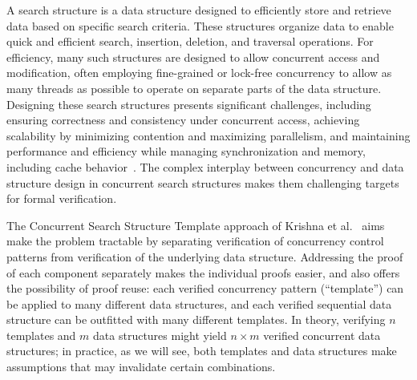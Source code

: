 \documentclass[a4paper,UKenglish,cleveref, autoref, thm-restate]{lipics-v2021}
\begin{document}
A search structure is a data structure designed to efficiently store and retrieve data based on specific search criteria. These structures organize data to enable quick and efficient search, insertion, deletion, and traversal operations. For efficiency, many such structures are designed to allow concurrent access and modification, often employing fine-grained or lock-free concurrency to allow as many threads as possible to operate on separate parts of the data structure. Designing these search structures presents significant challenges, including ensuring correctness and consistency under concurrent access, achieving scalability by minimizing contention and maximizing parallelism, and maintaining performance and efficiency while managing synchronization and memory, including cache behavior~\cite{masstree}. The complex interplay between concurrency and data structure design in concurrent search structures makes them challenging targets for formal verification.

The Concurrent Search Structure Template approach of Krishna et al.~\cite{templates} aims make the problem tractable by separating verification of concurrency control patterns from verification of the underlying data structure. Addressing the proof of each component separately makes the individual proofs easier, and also offers the possibility of proof reuse: each verified concurrency pattern (``template'') can be applied to many different data structures, and each verified sequential data structure can be outfitted with many different templates. In theory, verifying $n$ templates and $m$ data structures might yield $n \times m$ verified concurrent data structures; in practice, as we will see, both templates and data structures make assumptions that may invalidate certain combinations. %
\end{document}

